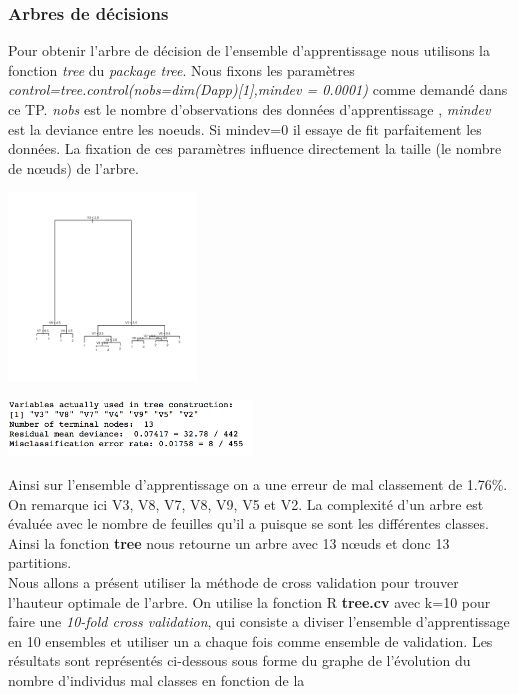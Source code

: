\documentclass[10pt]{article}
\begin{document}
\subsubsection{Arbres de décisions}
Pour obtenir l'arbre de décision de l'ensemble d'apprentissage nous utilisons la fonction \textit{tree} du \textit{package tree}. Nous fixons les paramètres\\  \textit{control=tree.control(nobs=dim(Dapp)[1],mindev = 0.0001)}  comme demandé dans ce TP. \textit{nobs} est le nombre d'observations des données d'apprentissage , \textit{mindev} est la deviance entre les noeuds. Si mindev=0 il essaye de fit parfaitement les données. La fixation de ces paramètres influence directement la taille (le nombre de nœuds) de l'arbre.\\
\begin{minipage}{.5\textwidth}
	\includegraphics[width=50mm]{Figures/bcw_apptree.png}
\end{minipage}%
\hspace{0.001\linewidth}
\begin{minipage}{.5\textwidth}
	\includegraphics[width=65mm]{Figures/bcw_apptree_summary.png}
\end{minipage}

Ainsi sur l'ensemble d'apprentissage on a une erreur de mal classement de 1.76\%. On remarque ici V3, V8, V7, V8, V9, V5 et V2. La  complexité d'un arbre est évaluée avec le nombre de feuilles qu'il a puisque se sont les différentes classes. Ainsi la fonction \textbf{tree} nous retourne un arbre avec 13 nœuds et donc 13 partitions.\\
Nous allons a présent utiliser la méthode de cross validation pour trouver l'hauteur optimale de l'arbre. On utilise la fonction R \textbf{tree.cv} avec k=10 pour faire une \textit{10-fold cross validation}, qui consiste a diviser l'ensemble d'apprentissage en 10 ensembles et utiliser un a chaque fois comme ensemble de validation.  Les résultats sont représentés ci-dessous sous forme du graphe de l'évolution du nombre d'individus mal classes en fonction de la 
\end{document}
